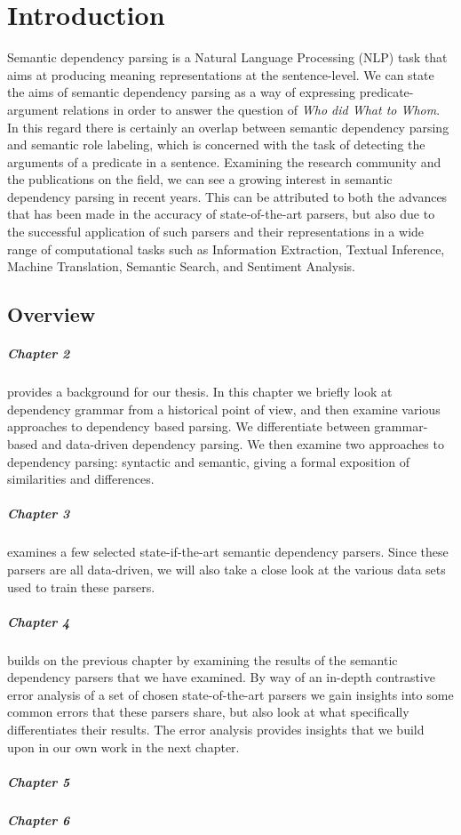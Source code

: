 \chapter{Introduction}
\label{chap:introduction}

Semantic dependency parsing is a Natural Language Processing (NLP) task that aims at producing meaning representations at the sentence-level. We can state the aims of semantic dependency parsing as a way of expressing predicate-argument  relations in order to answer the question of \textit{Who did What to Whom}.  In this regard there is certainly an overlap between semantic dependency parsing  and semantic role labeling, which is concerned with the task of detecting the arguments of a predicate in a sentence. Examining the research community and the publications on the field, we can see a growing interest in semantic dependency parsing in recent years. This can be attributed to both the advances that has been made in the accuracy of state-of-the-art parsers, but also due to the successful application of such parsers and their representations in a wide range of computational tasks such as Information Extraction, Textual Inference, Machine Translation, Semantic Search, and Sentiment Analysis.

\section{Overview} 

\paragraph{Chapter 2} provides a background for our thesis. In this chapter we briefly  look at dependency grammar from a historical point of view, and then examine various approaches to dependency based parsing. We differentiate between grammar-based and data-driven dependency parsing. We then examine two approaches to dependency parsing: syntactic and semantic, giving a formal exposition of similarities and differences.

\paragraph{Chapter 3} examines a few selected state-if-the-art semantic dependency parsers. Since these parsers are all data-driven, we will also take a close look at the various data sets used to train these parsers.

\paragraph{Chapter 4} builds on the previous chapter by examining the results of the semantic dependency parsers that we have examined. By way of an in-depth contrastive error analysis of a set of chosen state-of-the-art parsers we gain insights into some common errors that these parsers share, but also look at what specifically differentiates their results. The error analysis provides insights that we build upon in our own work in the next chapter.

\paragraph{Chapter 5} 

\paragraph{Chapter 6} 